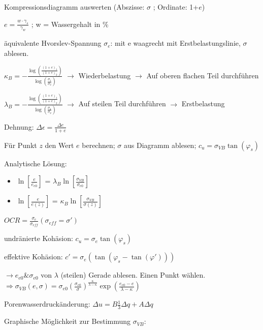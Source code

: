 \documentclass[fleqn,twoside]{article}
\begin{document}
\begin{itemize}

	\item Kompressionsdiagramm auswerten (Abszisse: $\sigma$ ; Ordinate: 1+$e$)
	\item $e=\frac{w \cdot \gamma_s}{\gamma_w}$ ; w = Wassergehalt in \%
	\item äquivalente Hvorslev-Spannung $\sigma_e$: mit e waagrecht mit Erstbelastungslinie, $\sigma$ ablesen.
	\item $\kappa_B = - \frac{ \log\left(\frac{(1+e)_1}{(1+e)_2}\right) }{  \log\left(\frac{\sigma_1}{\sigma_2}\right) }$ $\rightarrow$ Wiederbelastung $\rightarrow$ Auf oberen flachen Teil durchführen
	\item $\lambda_B = -\frac{ \log\left(\frac{(1+e)_1}{(1+e)_2}\right) }{ \log\left(\frac{\sigma_1}{\sigma_2}\right) }$ $\rightarrow$ Auf steilen Teil durchführen $\rightarrow$ Erstbelastung
    \item Dehnung: $\Delta\epsilon=\frac{\Delta e}{1+e}$
	\item Für Punkt $z$ den Wert $e$ berechnen; $\sigma$ aus Diagramm ablesen; $c_u = \sigma_{VB} \tan(\varphi_s)$
	\item Analytische Lösung:
	\begin{itemize}
	    \item $\ln\left[\frac{e}{e_{e0}}\right]$ = $\lambda_B \ln\left[\frac{\sigma_{VB}}{\sigma_{e0}}\right]$
	    \item $\ln\left[\frac{e}{e(z)}\right]$ = $\kappa_B \ln\left[\frac{\sigma_{VB}}{\sigma(z)}\right]$
	\end{itemize}
	\item $OCR = \frac{\sigma_e}{\sigma_{eff}} (\sigma_{eff} = \sigma')$
	\item undränierte Kohäsion: $c_u = \sigma_e \tan(\varphi_s)$
	\item effektive Kohäsion: $c' = \sigma_e(\tan(\varphi_s - \tan(\varphi')))$
	\item $\rightarrow e_{e0} \& \sigma_{e0}$ von $\lambda$ (steilen) Gerade ablesen. Einen Punkt wählen.\\
		$\boxed{\Rightarrow \sigma_{VB}(e,\sigma) = \sigma_{e0} \left( \frac{\sigma_{e0}}{\sigma}\right)^{\frac{\kappa}{\lambda-\kappa}} \exp\left( \frac{e_{e0}-e}{\lambda-\kappa} \right)}$\\
	\item Porenwasserdruckänderung: $\Delta u=B\frac13\Delta q+A\Delta q$
	\begin{minipage}{0.5\textwidth}
	        \item Graphische Möglichkeit zur Bestimmung $\sigma_{VB}$:

\end{minipage}
\end{itemize}
\end{document}
